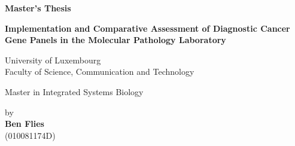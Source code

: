 \begin{center}

    {}\vspace{4cm}

    {\Large{\bf Master's Thesis}} \vspace{6cm}

    {\Large{\bf Implementation and Comparative Assessment of Diagnostic Cancer Gene Panels in the Molecular Pathology Laboratory}} \vspace{5cm}

    {\normalsize University of Luxembourg \\
    Faculty of Science, Communication and Technology
    } \vspace{1cm}

    {\normalsize Master in Integrated Systems Biology
    } \vspace{2cm}

    {\normalsize by \\\vspace{1cm}
    {\bf Ben Flies} \\
    (010081174D)} \vspace{1cm}

\end{center}
